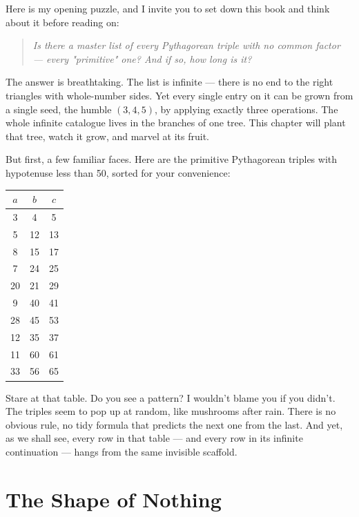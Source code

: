 Here is my opening puzzle, and I invite you to set down this book and think about it before reading on:

\begin{quote}
\itshape \textit{Is there a master list of every Pythagorean triple with no common factor --- every "primitive" one? And if so, how long is it?}
\end{quote}

The answer is breathtaking. The list is infinite --- there is no end to the right triangles with whole-number sides. Yet every single entry on it can be grown from a single seed, the humble $(3, 4, 5)$, by applying exactly three operations. The whole infinite catalogue lives in the branches of one tree. This chapter will plant that tree, watch it grow, and marvel at its fruit.

But first, a few familiar faces. Here are the primitive Pythagorean triples with hypotenuse less than 50, sorted for your convenience:

\begin{center}
\begin{tabular}{c c c}
\toprule
$a$ & $b$ & $c$ \\
\midrule
3 & 4 & 5 \\
5 & 12 & 13 \\
8 & 15 & 17 \\
7 & 24 & 25 \\
20 & 21 & 29 \\
9 & 40 & 41 \\
28 & 45 & 53 \\
12 & 35 & 37 \\
11 & 60 & 61 \\
33 & 56 & 65 \\
\bottomrule
\end{tabular}
\end{center}

Stare at that table. Do you see a pattern? I wouldn't blame you if you didn't. The triples seem to pop up at random, like mushrooms after rain. There is no obvious rule, no tidy formula that predicts the next one from the last. And yet, as we shall see, every row in that table --- and every row in its infinite continuation --- hangs from the same invisible scaffold.


\bigskip


\section{The Shape of Nothing}

